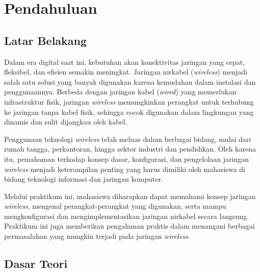 \section{Pendahuluan}
\subsection*{Latar Belakang}

Dalam era digital saat ini, kebutuhan akan konektivitas jaringan yang cepat, fleksibel, dan efisien semakin meningkat. Jaringan nirkabel (\textit{wireless}) menjadi salah satu solusi yang banyak digunakan karena kemudahan dalam instalasi dan penggunaannya. Berbeda dengan jaringan kabel (\textit{wired}) yang memerlukan infrastruktur fisik, jaringan \textit{wireless} memungkinkan perangkat untuk terhubung ke jaringan tanpa kabel fisik, sehingga cocok digunakan dalam lingkungan yang dinamis dan sulit dijangkau oleh kabel.

Penggunaan teknologi \textit{wireless} telah meluas dalam berbagai bidang, mulai dari rumah tangga, perkantoran, hingga sektor industri dan pendidikan. Oleh karena itu, pemahaman terhadap konsep dasar, konfigurasi, dan pengelolaan jaringan \textit{wireless} menjadi keterampilan penting yang harus dimiliki oleh mahasiswa di bidang teknologi informasi dan jaringan komputer.

Melalui praktikum ini, mahasiswa diharapkan dapat memahami konsep jaringan \textit{wireless}, mengenal perangkat-perangkat yang digunakan, serta mampu mengkonfigurasi dan mengimplementasikan jaringan nirkabel secara langsung. Praktikum ini juga memberikan pengalaman praktis dalam menangani berbagai permasalahan yang mungkin terjadi pada jaringan \textit{wireless}.

\subsection*{Dasar Teori}

